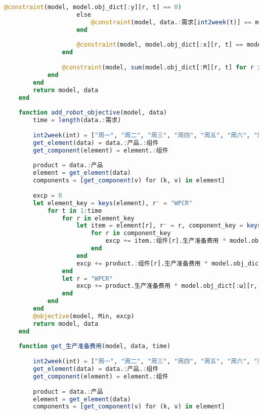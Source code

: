 \begin{appendices}
\begin{lstlisting}[language=julia]
                        @constraint(model, model.obj_dict[:y][r, t] == 0)
                    else
                        @constraint(model, data.:需求[int2week(t)] == model.obj_dict[:y][r, t-1] + model.obj_dict[:x][r, t] - model.obj_dict[:y][r, t])
                    end
    
                    @constraint(model, model.obj_dict[:x][r, t] == model.obj_dict[:x][r, t] * model.obj_dict[:ω][r, t])
                end
    
                @constraint(model, sum(model.obj_dict[:M][r, t] for r in element_key) <= data.:生产总工时限制[int2week(t)])
            end
        end
        return model, data
    end
    
    function add_robot_objective(model, data)
        time = length(data.:需求)
    
        int2week(int) = ["周一", "周二", "周三", "周四", "周五", "周六", "周日"][int]
        get_element(data) = data.:产品.:组件
        get_component(element) = element.:组件
    
        product = data.:产品
        element = get_element(data)
        components = [get_component(v) for (k, v) in element]
    
        excp = 0
        let element_key = keys(element), r⁻ = "WPCR"
            for t in 1:time
                for r in element_key
                    let item = element[r], r⁻ = r, component_key = keys(item.:组件)
                        for r in component_key
                            excp += item.:组件[r].生产准备费用 * model.obj_dict[:ω][r, t] + item.:组件[r].单件库存费用 * model.obj_dict[:y][r, t]
                        end
                    end
                    excp += product.:组件[r].生产准备费用 * model.obj_dict[:ω][r, t] + product.:组件[r].单件库存费用 * model.obj_dict[:y][r, t]
                end
                let r = "WPCR"
                    excp += product.生产准备费用 * model.obj_dict[:ω][r, t] + product.单件库存费用 * model.obj_dict[:y][r, t]
                end
            end
        end
        @objective(model, Min, excp)
        return model, data
    end
    
    function get_生产准备费用(model, data, time)
    
        int2week(int) = ["周一", "周二", "周三", "周四", "周五", "周六", "周日"][int]
        get_element(data) = data.:产品.:组件
        get_component(element) = element.:组件
    
        product = data.:产品
        element = get_element(data)
        components = [get_component(v) for (k, v) in element]
    

\end{lstlisting}
\end{appendices}
